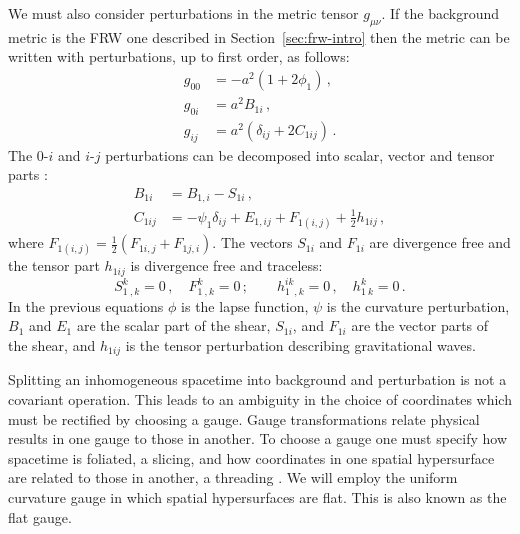 We must also consider perturbations in the metric tensor $g_{\mu\nu}$. If the
background metric is the FRW one described in Section~\ref{sec:frw-intro} then
the metric can be written with perturbations, up to first order, as follows:
% 
\begin{align}
 \label{eq:pertmetric-intro}
 g_{00} &= -a^2 (1 + 2\phi_1) \,, \nonumber\\
 g_{0i} &= a^2 B_{1i} \,, \nonumber\\
 g_{ij} &= a^2\left(\delta_{ij} + 2C_{1ij} \right) \,.
\end{align}
% 
The $0$-$i$ and $i$-$j$ perturbations can be decomposed into scalar, vector and
tensor parts \cite{Malik:2008im}:
\begin{align}
\label{eq:svt-intro}
  B_{1i} &= B_{1,i} - S_{1i} \,, \nonumber\\
  C_{1ij} &= -\psi_1\delta_{ij} + E_{1,ij} + F_{1(i,j)} + \frac{1}{2}h_{1ij}\,,
\end{align}
% 
where $F_{1(i,j)} = \frac{1}{2}(F_{1i,j} + F_{1j,i})$.
% 
The vectors $S_{1i}$ and $F_{1i}$ are divergence free and the tensor part
$h_{1ij}$
is divergence free and traceless:
% 
\begin{equation}
 S^k_{1~,k} = 0\,, \quad F^k_{1~,k}=0\,; \qquad h^{ik}_{1~~,k} = 0\,,
  \quad h^k_{1~k}= 0\,.
\end{equation}
% 
In the previous equations $\phi$ is the lapse function, $\psi$ is the curvature
perturbation, $B_1$ and $E_1$ are the scalar part of the shear, $S_{1i}$, and
$F_{1i}$
are the vector parts of the shear, and $h_{1ij}$ is the tensor perturbation
describing gravitational waves.


Splitting an inhomogeneous spacetime into background and perturbation is not a
covariant operation. This leads to an ambiguity in the choice of coordinates
which must be rectified by choosing a gauge. Gauge transformations relate
physical results in one gauge to those in another. To choose a gauge one must
specify how spacetime is foliated, \iec a slicing, and how coordinates in one
spatial hypersurface are related to those in another, \iec a threading
\cite{Malik:2008im}. We will
employ the uniform curvature gauge in which spatial hypersurfaces are flat. This
is also known as the flat gauge.

